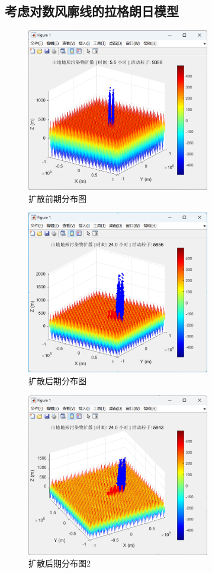 \documentclass{article}
\begin{document}
	\subsection{考虑对数风廓线的拉格朗日模型}
	\begin{figure}[htbp]
		\centering
		\includegraphics[width=8cm]{Logarithmic wind profile1.png}
		\caption{扩散前期分布图}
		\label{fig:your_label}
	\end{figure}
	\FloatBarrier
	\begin{figure}[htbp]
		\centering
		\includegraphics[width=8cm]{Logarithmic wind profile2.png}
		\caption{扩散后期分布图}
		\label{fig:your_label}
	\end{figure}
	\FloatBarrier
	\begin{figure}[htbp]
		\centering
		\includegraphics[width=8cm]{Logarithmic wind profile3.png}
		\caption{扩散后期分布图2}
		\label{fig:your_label}
	\end{figure}
	\FloatBarrier
\end{document}
